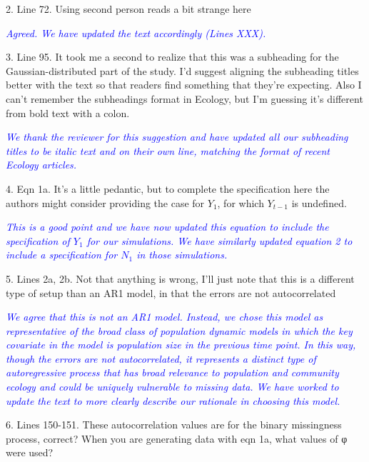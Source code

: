 \documentclass{article}
\begin{document}
\begin{linenumbers}
\bigskip

2. Line 72. Using second person reads a bit strange here

\noindent \textcolor{blue}{\textit{Agreed. We have updated the text accordingly (Lines XXX).}}   

\bigskip

3. Line 95. It took me a second to realize that this was a subheading for the Gaussian-distributed part of the study. I’d suggest aligning the subheading titles better with the text so that readers find something that they’re expecting. Also I can’t remember the subheadings format in Ecology, but I’m guessing it’s different from bold text with a colon.

\noindent \textcolor{blue}{\textit{We thank the reviewer for this suggestion and have updated all our subheading titles to be italic text and on their own line, matching the format of recent \textit{Ecology} articles.}}  

\bigskip

4. Eqn 1a. It’s a little pedantic, but to complete the specification here the authors might consider providing the case for $Y_1$, for which  $Y_{t-1}$ is undefined.

\noindent \textcolor{blue}{\textit{This is a good point and we have now updated this equation to include the specification of $Y_1$ for our simulations. We have similarly updated equation 2 to include a specification for $N_1$ in those simulations.}} 

\bigskip

5. Lines 2a, 2b. Not that anything is wrong, I’ll just note that this is a different type of setup than an AR1 model, in that the errors are not autocorrelated

\noindent \textcolor{blue}{\textit{We agree that this is not an AR1 model. Instead, we chose this model as representative of the broad class of population dynamic models in which the key covariate in the model is population size in the previous time point. In this way, though the errors are not autocorrelated, it represents a distinct type of autoregressive process that has broad relevance to population and community ecology and could be uniquely vulnerable to missing data. We have worked to update the text to more clearly describe our rationale in choosing this model.}}

\bigskip

6. Lines 150-151. These autocorrelation values are for the binary missingness process, correct? When you are generating data with eqn 1a, what values of φ were used?


\end{linenumbers}
\end{document}
